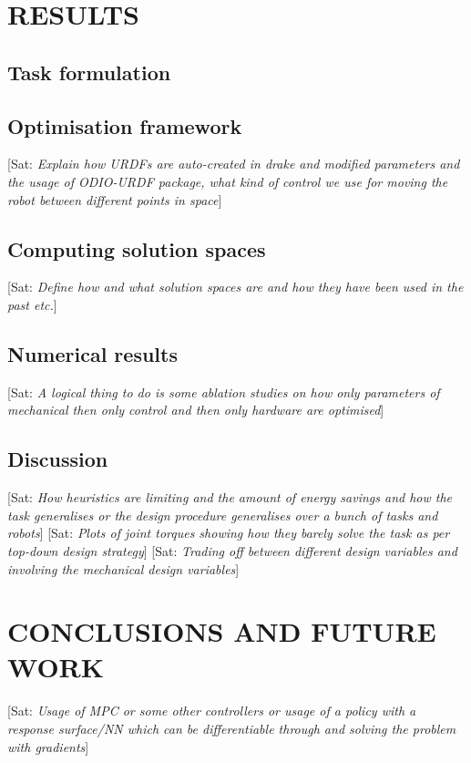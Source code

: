 \documentclass[letterpaper, 10 pt, conference]{ieeeconf}  %
\newcommand{\asc}[1]{{\color{blue!50!black} [Sat: {\em #1}]}\xspace}
\begin{document}
\section{RESULTS}

\subsection{Task formulation}
\subsection{Optimisation framework}
\asc{Explain how URDFs are auto-created in drake and modified parameters and the usage of ODIO-URDF package, what kind of control we use for moving the robot between different points in space}
\subsection{Computing solution spaces}
\asc{Define how and what solution spaces are and how they have been used in the past etc.}
\subsection{Numerical results}
\asc{A logical thing to do is some ablation studies on how only parameters of mechanical then only control and then only hardware are optimised}
\subsection{Discussion}
\asc{How heuristics are limiting and the amount of energy savings and how the task generalises or the design procedure generalises over a bunch of tasks and robots}
\asc{Plots of joint torques showing how they barely solve the task as per top-down design strategy}
\asc{Trading off between different design variables and involving the mechanical design variables}

\section{CONCLUSIONS AND FUTURE WORK}
\asc{Usage of MPC or some other controllers or usage of a policy with a response surface/NN which can be differentiable through and solving the problem with gradients}




\end{document}
